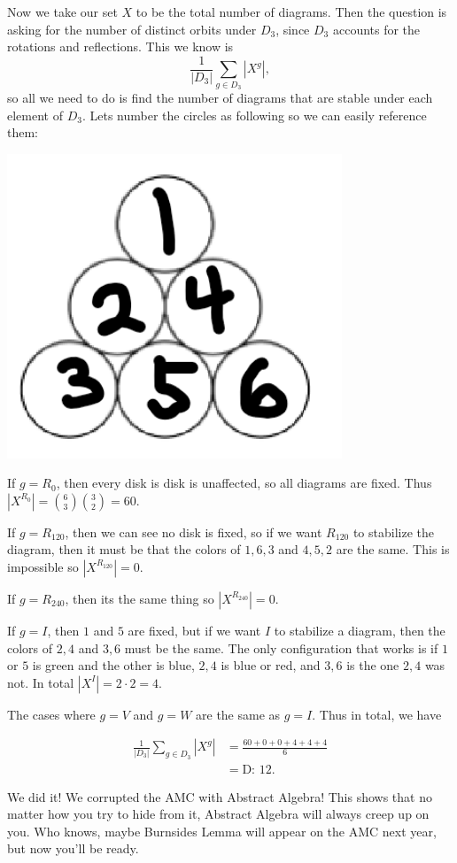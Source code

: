 \documentclass{article}
\begin{document}
Now we take our set $X$ to be the total number of diagrams. Then the question is asking for the number of distinct orbits under $D_3$, since $D_3$ accounts for the rotations and reflections. This we know is 
$$\frac{1}{|D_3|}\sum_{g\in D_3}|X^g|,$$
so all we need to do is find the number of diagrams that are stable under each element of $D_3$. Lets number the circles as following so we can easily reference them:
\begin{center}
    \includegraphics[width=10cm, scale=1.5]{images/modifiedamcimage.png}
\end{center}
If $g=R_0$, then every disk is disk is unaffected, so all diagrams are fixed. Thus $|X^{R_0}|=\binom{6}{3}\binom{3}{2}=60$. 

If $g=R_{120}$, then we can see no disk is fixed, so if we want $R_{120}$ to stabilize the diagram, then it must be that the colors of $1,6,3$ and $4,5,2$ are the same. This is impossible so $|X^{R_{120}}|=0$.

If $g=R_{240}$, then its the same thing so $|X^{R_{240}}|=0$.

If $g=I$, then $1$ and $5$ are fixed, but if we want $I$ to stabilize a diagram, then the colors of $2,4$ and $3,6$ must be the same. The only configuration that works is if $1$ or $5$ is green and the other is blue, $2,4$ is blue or red, and $3,6$ is the one $2,4$ was not. In total $|X^{I}| = 2\cdot 2 =4.$

The cases where $g=V$ and $g=W$ are the same as $g=I$. Thus in total, we have

\begin{align*}
    \frac{1}{|D_3|}\sum_{g\in D_3}|X^g| &= \frac{60+0+0+4+4+4}{6}\\
    &=\boxed{\text{D: }12}.
\end{align*}

We did it! We corrupted the AMC with Abstract Algebra! This shows that no matter how you try to hide from it, Abstract Algebra will always creep up on you. Who knows, maybe Burnsides Lemma will appear on the AMC next year, but now you'll be ready.
\end{document}
